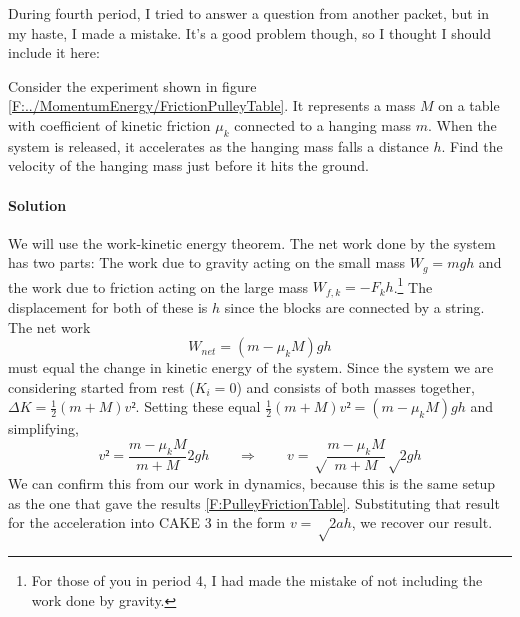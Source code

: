 During fourth period, I tried to answer a question from another packet, but in my haste, I made a mistake. It's a good problem though, so I thought I should include it here:
\begin{example}
Consider the experiment shown in figure \ref{F:../MomentumEnergy/FrictionPulleyTable}. It represents a mass $M$ on a table with coefficient of kinetic friction $μ_k$ connected to a hanging mass $m$. When the system is released, it accelerates as the hanging mass falls a distance $h$. Find the velocity of the hanging mass just before it hits the ground. 
\paragraph{Solution}
We will use the work-kinetic energy theorem. The net work done by the system has two parts: The work due to gravity acting on the small mass $W_g=mgh$ and the work due to friction acting on the large mass $W_{f,k}=- F_k h$.\footnote{For those of you in period 4, I had made the mistake of not including the work done by gravity.} The displacement for both of these is $h$ since the blocks are connected by a string. The net work
$$
W_{net} = (m - μ_k M)gh 
$$
must equal the change in kinetic energy of the system. Since the system we are considering started from rest ($K_i =0$) and consists of both masses together, $ΔK = \frac12 (m+M)v² $. Setting these equal $\frac12 (m+M)v² = (m - μ_k M)gh$ and simplifying, 
$$
v² = \frac{m - μ_k M}{m+M} 2gh 
\quad \quad ⇒ \quad \quad 
v =√{ \frac{m - μ_k M}{m+M}}√{2gh }
$$
We can confirm this from our work in dynamics, because this is the same setup as the one that gave the results \eqref{F:PulleyFrictionTable}. Substituting that result for the acceleration into CAKE 3 in the form $v=√{2ah}$, we recover our result.
\end{example}


